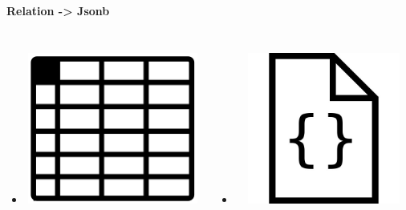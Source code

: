 \documentclass[usenames,dvipsnames, 18pt, compress, aspectratio=169]{beamer}
\begin{document}
\begin{frame}
    \frametitle{}
    \begin{center}
    \textbf{Relation -> Jsonb}

        \begin{columns}[T,onlytextwidth]
        \begin{itemize}[leftmargin=*]
            \item \includegraphics[width=6cm,height=5cm]{relation.png}
        \end{itemize}

        \begin{itemize}[leftmargin=*]
            \item \includegraphics[width=6cm,height=5cm]{document.jpg}
        \end{itemize}

        \end{columns}

    \end{center}
\end{frame}

\end{document}
